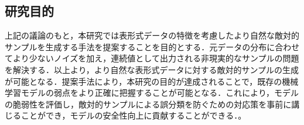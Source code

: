 \subsection{研究目的}
上記の議論のもと，本研究では表形式データの特徴を考慮したより自然な敵対的サンプルを生成する手法を提案することを目的とする．元データの分布に合わせてより少ないノイズを加え，連続値として出力される非現実的なサンプルの問題を解決する．以上より，より自然な表形式データに対する敵対的サンプルの生成が可能となる．提案手法により，本研究の目的が達成されることで，既存の機械学習モデルの弱点をより正確に把握することが可能となる．これにより，モデルの脆弱性を評価し，敵対的サンプルによる誤分類を防ぐための対応策を事前に講じることができ，モデルの安全性向上に貢献することができる．。